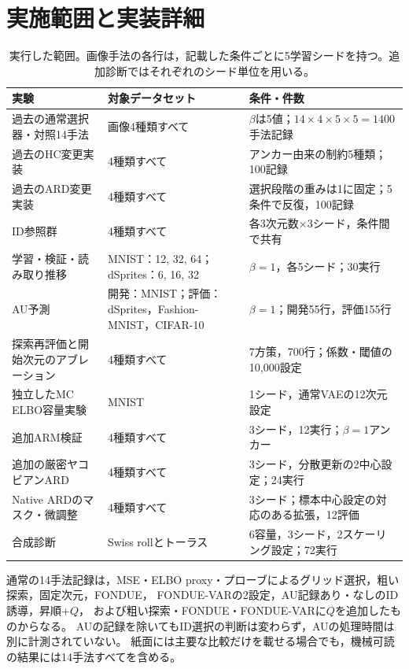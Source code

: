 \documentclass[11pt,a4paper]{ltjsarticle}
\begin{document}
\section{実施範囲と実装詳細}\label{app:coverage}
\begin{table}[H]
\caption{実行した範囲。画像手法の各行は，記載した条件ごとに5学習シードを持つ。追加診断ではそれぞれのシード単位を用いる。}
\label{tab:coverage}\small
\begin{tabularx}{\textwidth}{>{\raggedright\arraybackslash}p{}>{\raggedright\arraybackslash}p{}>{\raggedright\arraybackslash}X}\toprule
実験 & 対象データセット & 条件・件数 \\\midrule
過去の通常選択器・対照14手法 & 画像4種類すべて & $\beta$は5値；$14\times4\times5\times5=1400$手法記録 \\
過去のHC変更実装 & 4種類すべて & アンカー由来の制約5種類；100記録 \\
過去のARD変更実装 & 4種類すべて & 選択段階の重みは1に固定；5条件で反復，100記録 \\
ID参照群 & 4種類すべて & 各3次元数$\times$3シード，条件間で共有 \\
学習・検証・読み取り推移 & MNIST：12, 32, 64；dSprites：6, 16, 32 & $\beta=1$，各5シード；30実行 \\
AU予測 & 開発：MNIST；評価：dSprites，Fashion-MNIST，CIFAR-10 & $\beta=1$；開発55行，評価155行 \\
探索再評価と開始次元のアブレーション & 4種類すべて & 7方策，700行；係数・閾値の10,000設定 \\
独立したMC ELBO容量実験 & MNIST & 1シード，通常VAEの12次元設定 \\
追加ARM検証 & 4種類すべて & 3シード，12実行；$\beta=1$アンカー \\
追加の厳密ヤコビアンARD & 4種類すべて & 3シード，分散更新の2中心設定；24実行 \\
Native ARDのマスク・微調整 & 4種類すべて & 3シード；標本中心設定の対応のある拡張，12評価 \\
合成診断 & Swiss rollとトーラス & 6容量，3シード，2スケーリング設定；72実行 \\
\bottomrule\end{tabularx}
\end{table}

通常の14手法記録は，MSE・ELBO proxy・プローブによるグリッド選択，粗い探索，固定次元，FONDUE，
FONDUE-VARの2設定，AU記録あり・なしのID誘導，昇順+$Q$，
および粗い探索・FONDUE・FONDUE-VARに$Q$を追加したものからなる。
AUの記録を除いてもID選択の判断は変わらず，AUの処理時間は別に計測されていない。
紙面には主要な比較だけを載せる場合でも，機械可読の結果には14手法すべてを含める。
\end{document}
